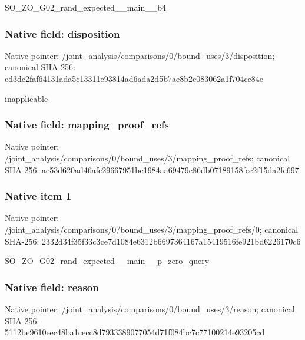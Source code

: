 \documentclass[10pt,a4paper]{article}
\begin{document}
\begingroup\raggedright\sloppy SO\_\allowbreak{}ZO\_\allowbreak{}G02\_\allowbreak{}rand\_\allowbreak{}expected\_\allowbreak{}\_\allowbreak{}main\_\allowbreak{}\_\allowbreak{}b4\par\endgroup

\subsubsection{Native field: disposition}
Native pointer: /joint\_\allowbreak{}analysis/comparisons/0/bound\_\allowbreak{}uses/3/disposition; canonical SHA-256: cd3dc2faf64131ada5c13311e93814ad6ada2d5b7ae8b2c083062a1f704cc84e

\begingroup\raggedright\sloppy inapplicable\par\endgroup

\subsubsection{Native field: mapping\_\allowbreak{}proof\_\allowbreak{}refs}
Native pointer: /joint\_\allowbreak{}analysis/comparisons/0/bound\_\allowbreak{}uses/3/mapping\_\allowbreak{}proof\_\allowbreak{}refs; canonical SHA-256: ae53d620ad46afc29667951be1984aa69479c86db07189158fcc2f15da2fc697

\subsubsection{Native item 1}
Native pointer: /joint\_\allowbreak{}analysis/comparisons/0/bound\_\allowbreak{}uses/3/mapping\_\allowbreak{}proof\_\allowbreak{}refs/0; canonical SHA-256: 2332d34f35f33c3ce7d1084e6312b6697364167a15419516fe921bd6226170c6

\begingroup\raggedright\sloppy SO\_\allowbreak{}ZO\_\allowbreak{}G02\_\allowbreak{}rand\_\allowbreak{}expected\_\allowbreak{}\_\allowbreak{}main\_\allowbreak{}\_\allowbreak{}p\_\allowbreak{}zero\_\allowbreak{}query\par\endgroup

\subsubsection{Native field: reason}
Native pointer: /joint\_\allowbreak{}analysis/comparisons/0/bound\_\allowbreak{}uses/3/reason; canonical SHA-256: 5112be9610eec48ba1cecc8d7933389077054d71f084bc7c77100214e93205cd
\end{document}
